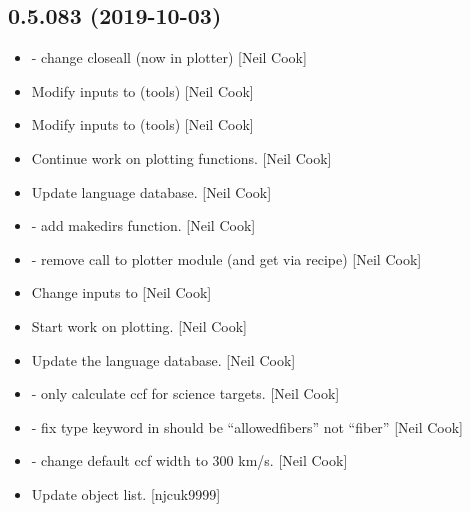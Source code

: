 \documentclass[a4paper,10pt,english]{report}
\begin{document}
\subsection{0.5.083 (2019-10-03)}
\label{\detokenize{misc/changelog:id60}}\begin{itemize}
\item {} 
 - change closeall (now in
plotter) {[}Neil Cook{]}

\item {} 
Modify inputs to  (tools) {[}Neil Cook{]}

\item {} 
Modify inputs to  (tools) {[}Neil Cook{]}

\item {} 
Continue work on plotting functions. {[}Neil Cook{]}

\item {} 
Update language database. {[}Neil Cook{]}

\item {} 
 - add makedirs function. {[}Neil Cook{]}

\item {} 
 - remove call to plotter module (and get via
recipe) {[}Neil Cook{]}

\item {} 
Change inputs to  {[}Neil Cook{]}

\item {} 
Start work on plotting. {[}Neil Cook{]}

\item {} 
Update the language database. {[}Neil Cook{]}

\item {} 
 - only calculate ccf for science targets.
{[}Neil Cook{]}

\item {} 
 - fix type keyword in 
should be “allowedfibers” not “fiber” {[}Neil Cook{]}

\item {} 
 - change default ccf
width to 300 km/s. {[}Neil Cook{]}

\item {} 
Update object list. {[}njcuk9999{]}


\end{itemize}
\end{document}
